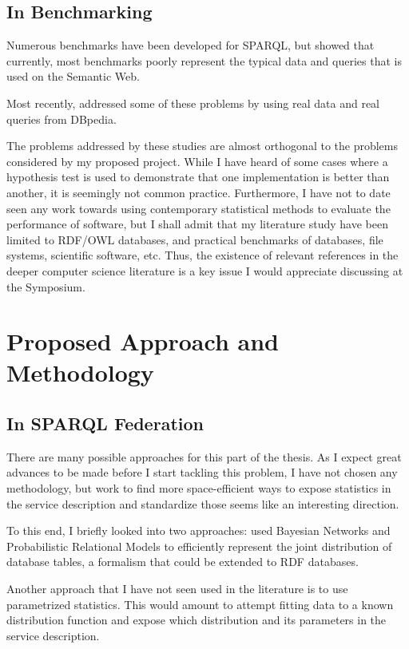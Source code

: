 \documentclass{llncs}
\begin{document}
\subsection{In Benchmarking}

Numerous benchmarks have been developed for SPARQL, but
\cite{Duan:2011:AOC:1989323.1989340} showed that currently, most
benchmarks poorly represent the typical data and queries that is used
on the Semantic Web.

Most recently, \cite{mxro:Morsey2011DBpedia} addressed some of these
problems by using real data and real queries from DBpedia.

The problems addressed by these studies are almost orthogonal to the
problems considered by my proposed project. While I have heard of some
cases where a hypothesis test is used to demonstrate that one
implementation is better than another, it is seemingly not common
practice. Furthermore, I have not to date seen any work towards using
contemporary statistical methods to evaluate the performance of
software, but I shall admit that my literature study have been limited
to RDF/OWL databases, and practical benchmarks of databases, file
systems, scientific software, etc. Thus, the existence of relevant
references in the deeper computer science literature is a key issue I
would appreciate discussing at the Symposium.


\section{Proposed Approach and Methodology}

\subsection{In SPARQL Federation}

There are many possible approaches for this part of the thesis. As I
expect great advances to be made before I start tackling this problem,
I have not chosen any methodology, but work to find more
space-efficient ways to expose statistics in the service description
and standardize those seems like an interesting direction. 

To this end, I briefly looked into two approaches:
\cite{Getoor:2001:SEU:375663.375727} used Bayesian Networks and
Probabilistic Relational Models to efficiently represent the joint
distribution of database tables, a formalism that could be extended to
RDF databases.

Another approach that I have not seen used in the literature is to use
parametrized statistics. This would amount to attempt fitting data to
a known distribution function and expose which distribution and its
parameters in the service description.
\end{document}
